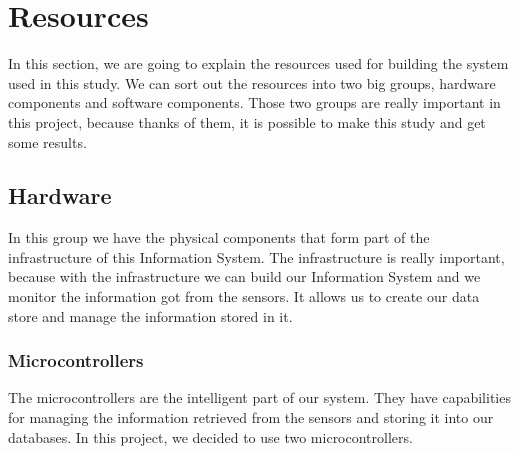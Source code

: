 \section{Resources}

In this section, we are going to explain the resources used for building the system used in this study. We can sort out the resources into two big groups, hardware components and software components. Those two groups are really important in this project, because thanks of them, it is possible to make this study and get some results.

\subsection{Hardware}

In this group we have the physical components that form part of the infrastructure of this Information System. The infrastructure is really important, because with the infrastructure we can build our Information System and we monitor the information got from the sensors. It allows us to create our data store and manage the information stored in it.

\subsubsection{Microcontrollers}

The microcontrollers are the intelligent part of our system. They have capabilities for managing the information retrieved from the sensors and storing it into our databases. In this project, we decided to use two microcontrollers.

